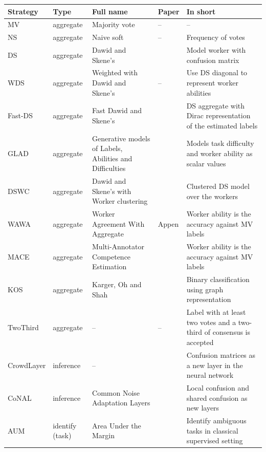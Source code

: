    \begin{center}
    \begin{longtable}{|l|p{15mm}|p{35mm}|p{25mm}|p{40mm}|}
    \hline
    \textbf{Strategy} & \textbf{Type} & \textbf{Full name} &  \textbf{Paper} & \textbf{In short}\\
    \hline
    MV & aggregate & Majority vote & -- & -- \\
    NS & aggregate & Naive soft & -- & Frequency of votes \\
    DS & aggregate & Dawid and Skene's & \citet{dawid_maximum_1979} & Model worker with confusion matrix \\
    WDS & aggregate & Weighted with Dawid and Skene's & -- & Use DS diagonal to represent worker abilities \\
    Fast-DS & aggregate & Fast Dawid and Skene's & \citet{sinha2018fast} & DS aggregate with Dirac representation of the estimated labels \\
    GLAD & aggregate & Generative models of Labels, Abilities and Difficulties & \citet{whitehill_whose_2009}& Models task difficulty and worker ability as scalar values  \\
    DSWC & aggregate & Dawid and Skene's with Worker clustering & \citet{imamura2018analysis} & Clustered DS model over the workers\\
    WAWA & aggregate & Worker Agreement With Aggregate & Appen & Worker ability is the accuracy against MV labels \\
    MACE & aggregate & Multi-Annotator Competence Estimation & \citet{hovy2013learning} & Worker ability is the accuracy against MV labels \\
    KOS & aggregate & Karger, Oh and Shah & \citet{karger2011iterative} & Binary classification using graph representation \\
    TwoThird & aggregate & -- & -- & Label with at least two votes and a two-third of consensus is accepted \\
    \hline \hline
    CrowdLayer & inference & -- & \citet{rodrigues2018deep} & Confusion matrices as a new layer in the neural network \\
    CoNAL & inference & Common Noise Adaptation Layers & \citet{chu2021learning} & Local confusion and shared confusion as new layers\\
    \hline \hline
    AUM & identify (task) & Area Under the Margin & \citet{pleiss_identifying_2020} & Identify ambiguous tasks in classical supervised setting\\

\end{longtable}
\end{center}
